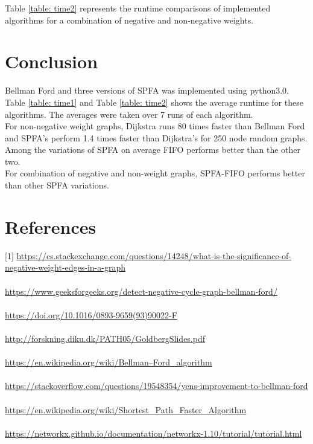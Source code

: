 \documentclass[12pt]{article}
\begin{document}
Table \ref{table: time2} represents the runtime comparisons of implemented algorithms for a combination of negative and non-negative weights. 

\section{Conclusion}
Bellman Ford and three versions of SPFA was implemented using python3.0. Table \ref{table: time1} and Table \ref{table: time2} shows the average runtime for these algorithms. The averages were taken over 7 runs of each algorithm. \\

For non-negative weight graphs, Dijkstra runs 80 times faster than Bellman Ford and SPFA's perform 1.4 times faster than Dijkstra's for 250 node random graphs. Among the variations of SPFA on average FIFO performs better than the other two. \\

For combination of negative and non-weight graphs, SPFA-FIFO performs better than other SPFA variations.\\  


\section*{References}
[1] \url{https://cs.stackexchange.com/questions/14248/what-is-the-significance-of-negative-weight-edges-in-a-graph} \\
\\ \noindent
[2] \url{https://www.geeksforgeeks.org/detect-negative-cycle-graph-bellman-ford/} \\
\\ \noindent
[3] \url{https://doi.org/10.1016/0893-9659(93)90022-F} \\
\\ \noindent
[4] \url{http://forskning.diku.dk/PATH05/GoldbergSlides.pdf} \\
\\ \noindent
[5] \url{https://en.wikipedia.org/wiki/Bellman–Ford_algorithm} \\
\\ \noindent
[6] \url{https://stackoverflow.com/questions/19548354/yens-improvement-to-bellman-ford} \\
\\ \noindent
[7] \url{https://en.wikipedia.org/wiki/Shortest_Path_Faster_Algorithm} \\
\\ \noindent
[8] \url{https://networkx.github.io/documentation/networkx-1.10/tutorial/tutorial.html}
\end{document}
